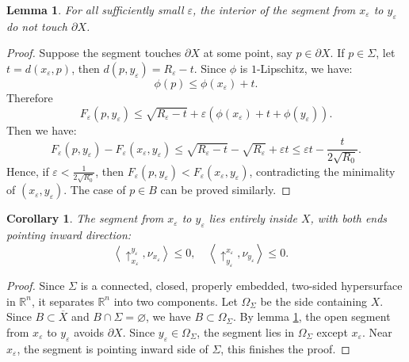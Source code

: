 \documentclass[reqno, 11pt]{amsart}
\theoremstyle{plain}
\newtheorem{corollary}[corollary]{Corollary}
\newtheorem{lemma}[lemma]{Lemma}
\theoremstyle{definition}
\theoremstyle{remark}
\numberwithin{equation}{section}
\begin{document}
\begin{lemma}\label{lem:NonTouchness}
	For all sufficiently small $\varepsilon$, the interior of the segment from $x_{\varepsilon}$ to $y_{\varepsilon}$ do not touch $\partial X$.
\end{lemma}
\begin{proof}
	Suppose the segment touches $\partial X$ at some point, say $p\in \partial X$. If $p \in \Sigma$, let $t = d(x_{\varepsilon}, p)$, then $d(p, y_{\varepsilon}) = R_{\varepsilon}-t$. Since $\phi$ is $1$-Lipschitz, we have:
	\begin{equation*}
		\phi(p)\le \phi(x_{\varepsilon}) + t.
	\end{equation*}
	Therefore
	\begin{equation*}
		F_{\varepsilon}(p, y_{\varepsilon})\le \sqrt{R_{\varepsilon}-t} + \varepsilon (\phi(x_{\varepsilon})+ t + \phi(y_{\varepsilon})).
	\end{equation*}
	Then we have:
	\begin{equation*}
		F_{\varepsilon}(p, y_{\varepsilon})-F_{\varepsilon}(x_{\varepsilon},  y_{\varepsilon}) \le \sqrt{R_{\varepsilon}-t} - \sqrt{R_{\varepsilon}} + \varepsilon t\le \varepsilon t -\frac{t}{2\sqrt{R_{0}}}.
	\end{equation*}
	Hence, if $\varepsilon<\frac{1}{2\sqrt{R_{0}}}$, then $F_{\varepsilon}(p, y_{\varepsilon}) <F_{\varepsilon}(x_{\varepsilon}, y_{\varepsilon})$, contradicting the minimality of $(x_{\varepsilon}, y_{\varepsilon})$. The case of $p\in B$ can be proved similarly.
\end{proof}

\begin{corollary}\label{cor:InwardLooking}
	The segment from $x_{\varepsilon}$ to $y_{\varepsilon}$ lies entirely inside $X$, with both ends pointing inward direction:
	\begin{equation*}
		\left\langle \uparrow_{x_{\varepsilon}}^{y_{\varepsilon}}, \nu_{x_{\varepsilon}} \right\rangle \le 0, \quad 
		\left\langle \uparrow_{y_{\varepsilon}}^{x_{\varepsilon}}, \nu_{y_{\varepsilon}} \right\rangle \le 0. \quad 
	\end{equation*}
\end{corollary}
\begin{proof}
	Since $\Sigma$ is a connected, closed, properly embedded, two-sided hypersurface in $\mathbb{R}^n$, it separates $\mathbb{R}^n$ into two components. Let $\Omega_\Sigma$ be the side containing $X$. Since $B\subset \overline{X}$ and $B\cap \Sigma =\varnothing$, we have $B\subset \Omega_\Sigma$. By lemma \ref{lem:NonTouchness}, the open segment from $x_{\varepsilon}$ to $y_{\varepsilon}$ avoids $\partial X$. Since $y_{\varepsilon}\in \Omega_\Sigma$, the segment lies in $\Omega_\Sigma$ except $x_{\varepsilon}$. Near $x_{\varepsilon}$, the segment is pointing inward side of $\Sigma$, this finishes the proof.
\end{proof}
\end{document}

